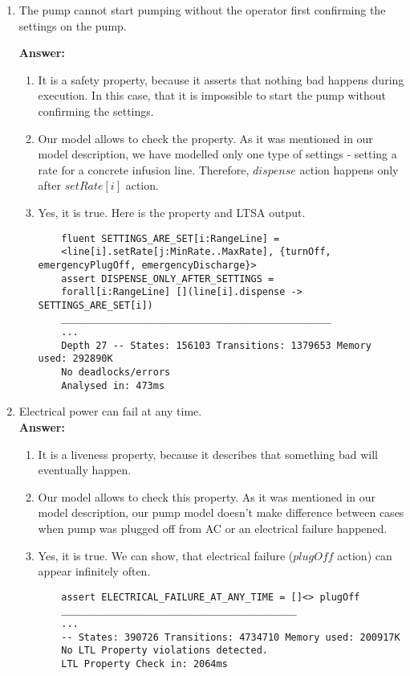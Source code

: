 \documentclass{article}
\begin{document}
\begin{enumerate}
    \item The pump cannot start pumping without the operator first confirming the settings on the pump.
    
    \textbf{Answer:}
    \begin{enumerate}
    \item It is a safety property, because it asserts that nothing bad happens during execution. In this case, that it is
    impossible to start the pump without confirming the settings.
    \item  Our model allows to check the property. As it was mentioned in our model description, we have modelled only one
    type of settings - setting a rate for a concrete infusion line. Therefore, $dispense$ action happens only after
    $setRate[i]$ action.
    \item Yes, it is true. Here is the property and LTSA output.
	\begin{verbatim}
	fluent SETTINGS_ARE_SET[i:RangeLine] = 
	<line[i].setRate[j:MinRate..MaxRate], {turnOff, emergencyPlugOff, emergencyDischarge}>
	assert DISPENSE_ONLY_AFTER_SETTINGS = 
	forall[i:RangeLine] [](line[i].dispense -> SETTINGS_ARE_SET[i])
	_______________________________________________
	...
	Depth 27 -- States: 156103 Transitions: 1379653 Memory used: 292890K
	No deadlocks/errors
	Analysed in: 473ms
	\end{verbatim}    
    \end{enumerate}
    
    \item Electrical power can fail at any time.\\
    \textbf{Answer:}
    \begin{enumerate}
    \item It is a liveness property, because it describes that something bad will eventually happen.
    \item Our model allows to check this property. As it was mentioned in our model description, our pump model doesn't make
    difference between cases when pump was plugged off from AC or an electrical failure happened.
    \item Yes, it is true. We can show, that electrical failure ($plugOff$ action) can appear infinitely often.
    \begin{verbatim}
    assert ELECTRICAL_FAILURE_AT_ANY_TIME = []<> plugOff
    _________________________________________
    ...
    -- States: 390726 Transitions: 4734710 Memory used: 200917K
    No LTL Property violations detected.
    LTL Property Check in: 2064ms
    \end{verbatim}
    \end{enumerate}
     


\end{enumerate}
\end{document}
